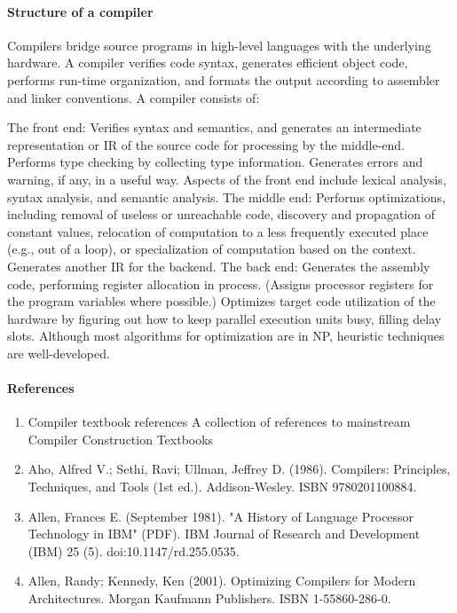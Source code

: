 \documentclass{article}
\begin{document}
\paragraph{Structure of a compiler}

Compilers bridge source programs in high-level languages with the underlying hardware. A compiler verifies code syntax, generates efficient object code, performs run-time organization, and formats the output according to assembler and linker conventions. A compiler consists of:

    The front end: Verifies syntax and semantics, and generates an intermediate representation or IR of the source code for processing by the middle-end. Performs type checking by collecting type information. Generates errors and warning, if any, in a useful way. Aspects of the front end include lexical analysis, syntax analysis, and semantic analysis.
    The middle end: Performs optimizations, including removal of useless or unreachable code, discovery and propagation of constant values, relocation of computation to a less frequently executed place (e.g., out of a loop), or specialization of computation based on the context. Generates another IR for the backend.
    The back end: Generates the assembly code, performing register allocation in process. (Assigns processor registers for the program variables where possible.) Optimizes target code utilization of the hardware by figuring out how to keep parallel execution units busy, filling delay slots. Although most algorithms for optimization are in NP, heuristic techniques are well-developed.
    
\paragraph{References}

\begin{enumerate}

\item Compiler textbook references A collection of references to mainstream Compiler Construction Textbooks

\item Aho, Alfred V.; Sethi, Ravi; Ullman, Jeffrey D. (1986). Compilers: Principles, Techniques, and Tools (1st ed.). Addison-Wesley. ISBN 9780201100884.
\item Allen, Frances E. (September 1981). "A History of Language Processor Technology in IBM" (PDF). IBM Journal of Research and Development (IBM) 25 (5). doi:10.1147/rd.255.0535.
\item Allen, Randy; Kennedy, Ken (2001). Optimizing Compilers for Modern Architectures. Morgan Kaufmann Publishers. ISBN 1-55860-286-0.

\end{enumerate}
\end{document}

